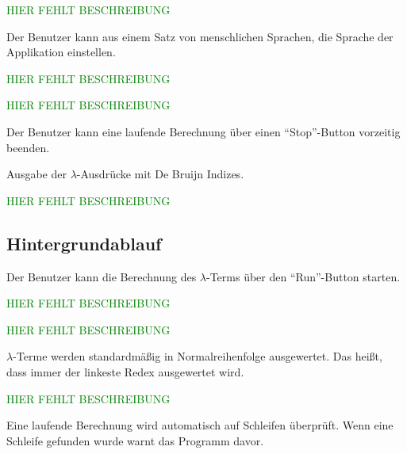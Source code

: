 \documentclass[parskip=full,11pt,twoside]{scrartcl}
\begin{document}
\textcolor{green}{HIER FEHLT BESCHREIBUNG}

Der Benutzer kann aus einem Satz von menschlichen Sprachen, die Sprache der Applikation einstellen.


\textcolor{green}{HIER FEHLT BESCHREIBUNG}

\textcolor{green}{HIER FEHLT BESCHREIBUNG}

 
Der Benutzer kann eine laufende Berechnung über einen \enquote{Stop}-Button vorzeitig beenden.

Ausgabe der $\lambda$-Ausdrücke mit De Bruijn Indizes.



\textcolor{green}{HIER FEHLT BESCHREIBUNG}

\subsection{Hintergrundablauf}
Der Benutzer kann die Berechnung des $\lambda$-Terms über den \enquote{Run}-Button starten.

\textcolor{green}{HIER FEHLT BESCHREIBUNG}

\textcolor{green}{HIER FEHLT BESCHREIBUNG}

$\lambda$-Terme werden standardmäßig in Normalreihenfolge ausgewertet.
Das heißt, dass immer der linkeste Redex ausgewertet wird.

\textcolor{green}{HIER FEHLT BESCHREIBUNG}

Eine laufende Berechnung wird automatisch auf Schleifen überprüft. Wenn eine Schleife gefunden wurde warnt das Programm davor.
\end{document}
